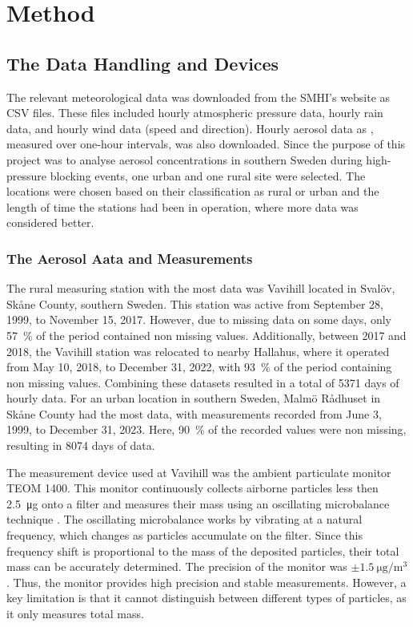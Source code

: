 \newpage
\section{Method}
\subsection{The Data Handling and Devices}
The relevant meteorological data was downloaded from the SMHI’s website as CSV files. These files included hourly atmospheric pressure data, hourly rain data, and hourly wind data (speed and direction). Hourly aerosol data as \PM, measured over one-hour intervals, was also downloaded. Since the purpose of this project was to analyse aerosol concentrations in southern Sweden during high-pressure blocking events, one urban and one rural site were selected. The locations were chosen based on their classification as rural or urban and the length of time the stations had been in operation, where more data was considered better. 

\subsubsection{The Aerosol Aata and Measurements}
The rural measuring station with the most data was Vavihill located in Svalöv, Skåne County, southern Sweden. This station was active from September 28, 1999, to November 15, 2017. However, due to missing data on some days, only \SI{57}{\%} of the period contained non missing values. Additionally, between 2017 and 2018, the Vavihill station was relocated to nearby Hallahus, where it operated from May 10, 2018, to December 31, 2022, with \SI{93}{\%} of the period containing non missing values. Combining these datasets resulted in a total of \SI{5371}{} days of hourly data. For an urban location in southern Sweden, Malmö Rådhuset in Skåne County had the most data, with measurements recorded from June 3, 1999, to December 31, 2023. Here, \SI{90}{\%} of the recorded values were non missing, resulting in \SI{8074}{} days of data. 

The measurement device used at Vavihill was the ambient particulate monitor TEOM 1400. This monitor continuously collects airborne particles less then \SI{2.5}{\micro\g} onto a filter and measures their mass using an oscillating microbalance technique \cite{thermofisherscientificinc.TEOMSeries1400a2007}. The oscillating microbalance works by vibrating at a natural frequency, which changes as particles accumulate on the filter. Since this frequency shift is proportional to the mass of the deposited particles, their total mass can be accurately determined. The precision of the monitor was $\pm\SI{1.5}{\micro\gram\per\meter\cubed}$. Thus, the monitor provides high precision and stable measurements. However, a key limitation is that it cannot distinguish between different types of particles, as it only measures total mass.

